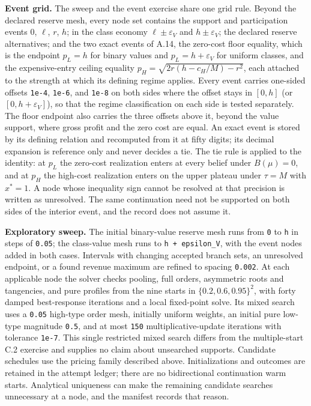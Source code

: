 \documentclass[
  11pt,
]{article}
\begin{document}


\textbf{Event grid.} The sweep and the event exercise share one grid
rule. Beyond the declared reserve mesh, every node set contains the
support and participation events \(0\), \(\ell\), \(r\), \(h\); in the
class economy \(\ell\pm\varepsilon_V\) and \(h\pm\varepsilon_V\); the
declared reserve alternatives; and the two exact events of A.14, the
zero-cost floor equality, which is the endpoint
\(p_L=h\) for binary values and \(p_L=h+\varepsilon_V\) for uniform
classes, and the expensive-entry ceiling equality \(p_H=\sqrt{2r(h-c_H/M)-r^2}\), each
attached to the strength at which its defining regime applies. Every
event carries one-sided offsets \texttt{1e-4}, \texttt{1e-6}, and
\texttt{1e-8} on both sides where the offset stays in \([0,h]\) (or
\([0,h+\varepsilon_V]\)), so that the regime classification on each side
is tested separately. The floor endpoint also carries the three
offsets above it, beyond the value support, where gross profit and the
zero cost are equal.
An exact event is stored by its defining relation
and recomputed from it at fifty digits; its decimal expansion is
reference only and never decides a tie. The tie rule is applied to the
identity: at \(p_L\) the zero-cost realization enters at every belief under
\(B(\mu)=0\), and at \(p_H\) the high-cost realization enters on the upper
plateau under \(\tau=M\) with \(x^*=1\). A node whose inequality sign
cannot be resolved at that precision is written as unresolved. The same
continuation need not be supported on both sides of the interior event, and the
record does not assume it.

\textbf{Exploratory sweep.} The initial binary-value reserve mesh runs
from \texttt{0} to \texttt{h} in steps of \texttt{0.05}; the class-value
mesh runs to \texttt{h\ +\ epsilon\_V}, with the event nodes added in
both cases. Intervals with changing accepted branch sets, an unresolved
endpoint, or a found revenue maximum are refined to spacing
\texttt{0.002}. At each applicable node the solver checks pooling, full
orders, asymmetric roots and tangencies, and pure profiles from the nine
starts in \(\{0.2,0.6,0.95\}^2\), with forty damped best-response
iterations and a local fixed-point solve. Its mixed search uses a
\texttt{0.05} high-type order mesh, initially uniform weights, an
initial pure low-type magnitude \texttt{0.5}, and at most \texttt{150}
multiplicative-update iterations with tolerance \texttt{1e-7}. This
single restricted mixed search differs from the multiple-start C.2
exercise and supplies no claim about unsearched supports. Candidate
schedules use the pricing family described above. Initializations and
outcomes are retained in the attempt ledger; there are no bidirectional
continuation warm starts. Analytical uniqueness can make the remaining
candidate searches unnecessary at a node, and the manifest records that
reason.
\end{document}
